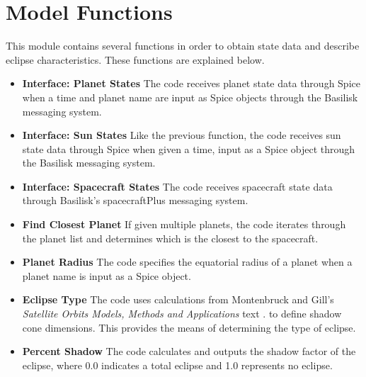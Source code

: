 \section{Model Functions}
This module contains several functions in order to obtain state data and describe eclipse characteristics. These functions are explained below.

\begin{itemize}
	\item \textbf{Interface: Planet States}
	The code receives planet state data through Spice when a time and planet name are input as Spice objects through the Basilisk messaging system.
	\item \textbf{Interface: Sun States}
	Like the previous function, the code receives sun state data through Spice when given a time, input as a Spice object through the Basilisk messaging system.
	\item \textbf{Interface: Spacecraft States}
	The code receives spacecraft state data through Basilisk's spacecraftPlus messaging system.
	\item \textbf{Find Closest Planet}
	If given multiple planets, the code iterates through the planet list and determines which is the closest to the spacecraft.
	\item \textbf{Planet Radius}
	The code specifies the equatorial radius of a planet when a planet name is input as a Spice object.
	\item \textbf{Eclipse Type}
	The code uses calculations from Montenbruck and Gill's \textit{Satellite Orbits Models, Methods and Applications} text \cite{bib:1}. to define shadow cone dimensions. This provides the means of determining the type of eclipse.
	\item \textbf{Percent Shadow}
	The code calculates and outputs the shadow factor of the eclipse, where 0.0 indicates a total eclipse and 1.0 represents no eclipse.
	
\end{itemize}

